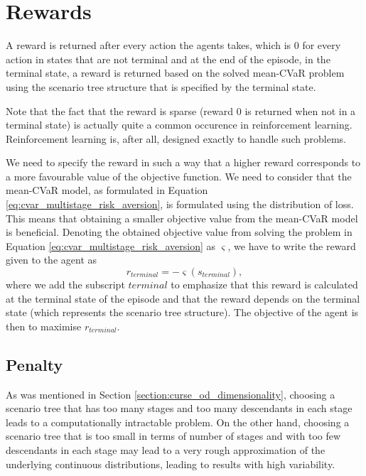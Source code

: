 \section{Rewards}
\label{section:rewards}
A reward is returned after every action the agents takes, which is 0 for every action in states that are not terminal and at the end of the episode, in the terminal state, a reward is returned based on the solved mean-CVaR problem using the scenario tree structure that is specified by the terminal state. 
\begin{rem}
Note that the fact that the reward is sparse (reward 0 is returned when not in a terminal state) is actually quite a common occurence in reinforcement learning. Reinforcement learning is, after all, designed exactly to handle such problems.
\end{rem}

We need to specify the reward in such a way that a higher reward corresponds to a more favourable value of the objective function. We need to consider that the mean-CVaR model, as formulated in Equation \ref{eq:cvar_multistage_risk_aversion}, is formulated using the distribution of loss. This means that obtaining a smaller objective value from the mean-CVaR model is beneficial. Denoting the obtained objective value from solving the problem in Equation \ref{eq:cvar_multistage_risk_aversion} as $\varsigma$, we have to write the reward given to the agent as
\begin{equation*}
r_{terminal} = -\varsigma(s_{terminal}),
\end{equation*}
where we add the subscript $terminal$ to emphasize that this reward is calculated at the terminal state of the episode and that the reward depends on the terminal state (which represents the scenario tree structure). The objective of the agent is then to maximise $r_{terminal}$.

\subsection{Penalty}
\label{subsection:penalty_subsection}
As was mentioned in Section \ref{section:curse_od_dimensionality}, choosing a scenario tree that has too many stages and too many descendants in each stage leads to a computationally intractable problem. On the other hand, choosing a scenario tree that is too small in terms of number of stages and with too few descendants in each stage may lead to a very rough approximation of the underlying continuous distributions, leading to results with high variability. 

